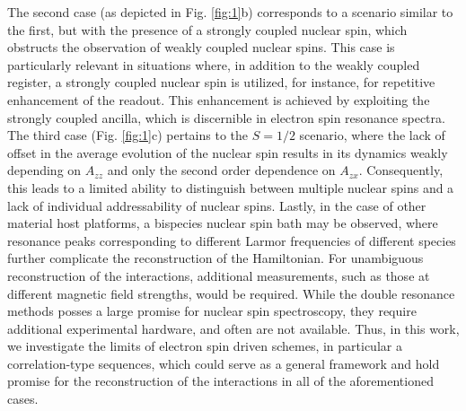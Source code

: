 \documentclass[%
 reprint,
superscriptaddress,
 amsmath,amssymb,
 aps,
]{revtex4-2}
\begin{document}
The second case (as depicted in Fig. \ref{fig:1}b) corresponds to a scenario similar to the first, but with the presence of a strongly coupled nuclear spin, which obstructs the observation of weakly coupled nuclear spins.
This case is particularly relevant in situations where, in addition to the weakly coupled register, a strongly coupled nuclear spin is utilized, for instance, for repetitive enhancement of the readout.
This enhancement is achieved by exploiting the strongly coupled ancilla, which is discernible in electron spin resonance spectra.
The third case (Fig. \ref{fig:1}c) pertains to the $S=1/2$ scenario, where the lack of offset in the average evolution of the nuclear spin results in its dynamics weakly depending on $A_{zz}$ and only the second order dependence on $A_{zx}$.
Consequently, this leads to a limited ability to distinguish between multiple nuclear spins and a lack of individual addressability of nuclear spins.
Lastly, in the case of other material host platforms, a bispecies nuclear spin bath may be observed, where resonance peaks corresponding to different Larmor frequencies of different species further complicate the reconstruction of the Hamiltonian.
For unambiguous reconstruction of the interactions, additional measurements, such as those at different magnetic field strengths, would be required.
While the double resonance methods \cite{Bradley:2019aa,zaiser2016enhancing} posses a large promise for nuclear spin spectroscopy, they require additional experimental hardware, and often are not available. 
Thus, in this work, we investigate the limits of electron spin driven schemes, in particular a correlation-type sequences, which could serve as a general framework and hold promise for the reconstruction of the interactions in all of the aforementioned cases.  
 




\end{document}
